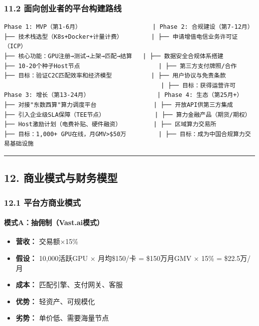 \documentclass[UTF8,a4paper,12pt]{ctexart}
\begin{document}
\subsubsection{11.2
面向创业者的平台构建路线}\label{ux9762ux5411ux521bux4e1aux8005ux7684ux5e73ux53f0ux6784ux5efaux8defux7ebf}

\begin{verbatim}
Phase 1: MVP（第1-6月）                    | Phase 2: 合规建设（第7-12月）
├── 技术栈选型（K8s+Docker+计量计费）        | ├── 申请增值电信业务许可证（ICP）
├── 核心功能：GPU注册→测试→上架→匹配→结算   | ├── 数据安全合规体系搭建
├── 10-20个种子Host节点                      | ├── 第三方支付牌照/合作
├── 目标：验证C2C匹配效率和经济模型           | ├── 用户协议与免责条款
                                            | ├── 目标：获得运营许可
Phase 3: 增长（第13-24月）                   | Phase 4: 生态（第25月+）
├── 对接"东数西算"算力调度平台                | ├── 开放API供第三方集成
├── 引入企业级SLA保障（TEE节点）              | ├── 算力金融产品（期货/期权）
├── Host激励计划（电费补贴、硬件融资）         | ├── 区域算力交易所
├── 目标：1,000+ GPU在线，月GMV>$50万         | ├── 目标：成为中国合规算力交易基础设施
\end{verbatim}

\begin{center}\rule{0.5\linewidth}{0.5pt}\end{center}

\pagebreak

\subsection{12.
商业模式与财务模型}\label{ux5546ux4e1aux6a21ux5f0fux4e0eux8d22ux52a1ux6a21ux578b}

\subsubsection{12.1
平台方商业模式}\label{ux5e73ux53f0ux65b9ux5546ux4e1aux6a21ux5f0f}

\paragraph{模式A：抽佣制（Vast.ai模式）}\label{ux6a21ux5f0faux62bdux4f63ux5236vast.aiux6a21ux5f0f}

\begin{itemize}
\tightlist
\item
  \textbf{营收：} 交易额×15\%
\item
  \textbf{假设：} 10,000活跃GPU × 月均\$150/卡 = \$150万月GMV × 15\% =
  \$22.5万/月
\item
  \textbf{成本：} 匹配引擎、支付网关、客服
\item
  \textbf{优势：} 轻资产、可规模化
\item
  \textbf{劣势：} 单价低、需要海量节点
\end{itemize}
\end{document}
